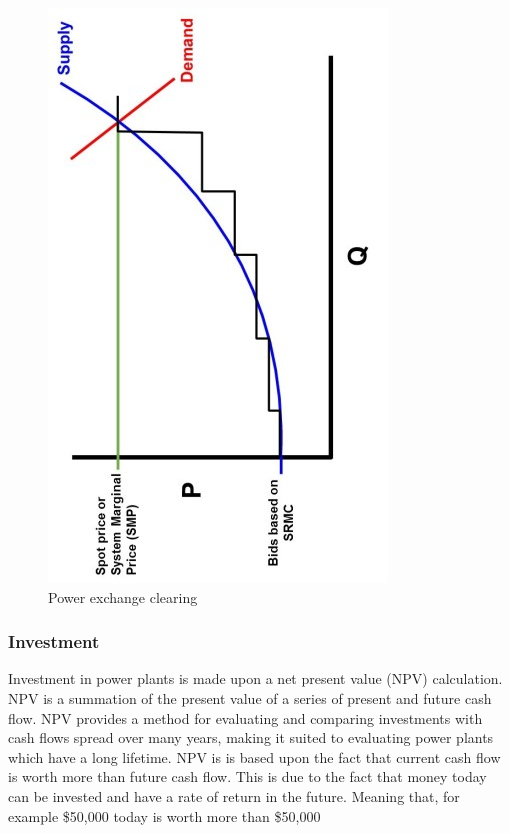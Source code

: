 \begin{figure}
	\centering
	\includegraphics[width=1\linewidth]{figures/power_market}
	\caption{Power exchange clearing \cite{nuclear_economics_consulting_group_2019}}
	\label{fig:powermarket}
\end{figure}

\subsubsection{Investment}

Investment in power plants is made upon a net present value (NPV) calculation. NPV is a summation of the present value of a series of present and future cash flow. NPV provides a method for evaluating and comparing investments with cash flows spread over many years, making it suited to evaluating power plants which have a long lifetime. NPV is is based upon the fact that current cash flow is worth more than future cash flow. This is due to the fact that money today can be invested and have a rate of return in the future. Meaning that, for example \$50,000 today is worth more than \$50,000

